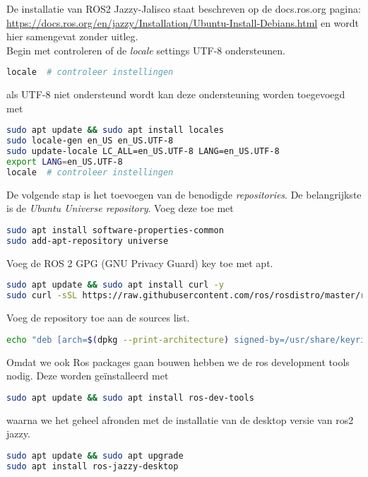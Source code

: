 \documentclass[12pt,a4paper]{exam}
\begin{document}
De installatie van ROS2 Jazzy-Jalisco staat beschreven op de docs.ros.org pagina:\\\noindent 
{\small \url{https://docs.ros.org/en/jazzy/Installation/Ubuntu-Install-Debians.html}} en wordt hier samengevat zonder uitleg.\\
Begin met controleren of de \textit{locale} settings UTF-8 ondersteunen. 
\begin{lstlisting}[language=bash]
locale  # controleer instellingen
\end{lstlisting}
als UTF-8 niet ondersteund wordt kan deze ondersteuning worden toegevoegd met
\begin{lstlisting}[language=bash]
sudo apt update && sudo apt install locales
sudo locale-gen en_US en_US.UTF-8
sudo update-locale LC_ALL=en_US.UTF-8 LANG=en_US.UTF-8
export LANG=en_US.UTF-8
locale  # controleer instellingen
\end{lstlisting}
De volgende stap is het toevoegen van de benodigde \textit{repositories}. De belangrijkste is de \textit{Ubuntu Universe repository}. Voeg deze toe met
\begin{lstlisting}[language=bash]
sudo apt install software-properties-common
sudo add-apt-repository universe
\end{lstlisting}
Voeg de ROS 2 GPG (GNU Privacy Guard) key toe met apt.
\begin{lstlisting}[language=bash]
sudo apt update && sudo apt install curl -y
sudo curl -sSL https://raw.githubusercontent.com/ros/rosdistro/master/ros.key -o /usr/share/keyrings/ros-archive-keyring.gpg
\end{lstlisting}
Voeg de repository toe aan de sources list.
\begin{lstlisting}[language=bash]
echo "deb [arch=$(dpkg --print-architecture) signed-by=/usr/share/keyrings/ros-archive-keyring.gpg] http://packages.ros.org/ros2/ubuntu $(. /etc/os-release && echo $UBUNTU_CODENAME) main" | sudo tee /etc/apt/sources.list.d/ros2.list > /dev/null
\end{lstlisting}
Omdat we ook Ros packages gaan bouwen hebben we de ros development tools nodig. Deze worden ge\"installeerd met
\begin{lstlisting}[language=bash]
sudo apt update && sudo apt install ros-dev-tools
\end{lstlisting}
waarna we het geheel afronden met de installatie van de desktop versie van ros2 jazzy.
\begin{lstlisting}[language=bash]
sudo apt update && sudo apt upgrade
sudo apt install ros-jazzy-desktop
\end{lstlisting}
\end{document}

